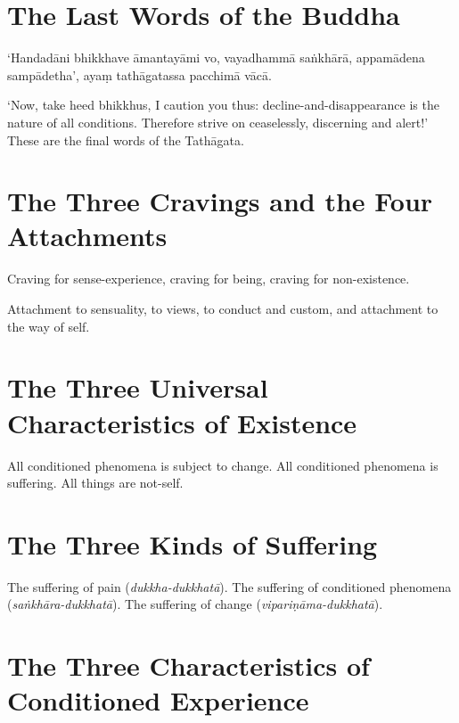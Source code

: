 \section*{The Last Words of the Buddha}

‘Handadāni bhikkhave āmantayāmi vo, vayadhammā saṅkhārā, appamādena sampādetha’,
ayaṃ tathāgatassa pacchimā vācā.

‘Now, take heed bhikkhus, I caution you thus: decline-and-disappearance is the
nature of all conditions. Therefore strive on ceaselessly, discerning and
alert!’ These are the final words of the Tathāgata.


\section*{The Three Cravings and the Four Attachments}

Craving for sense-experience, craving for being, craving for non-existence.

Attachment to sensuality, to views, to conduct and custom, and attachment to the
way of self.


\vspace*{-\baselineskip}

\section*{The Three Universal Characteristics of Existence}

All conditioned phenomena is subject to change.
All conditioned phenomena is suffering.
All things are not-self.


\vspace*{-\baselineskip}

\section*{The Three Kinds of Suffering}

The suffering of pain (\emph{dukkha-dukkhatā}).
The suffering of conditioned phenomena (\emph{saṅkhāra-dukkhatā}).
The suffering of change (\emph{vipariṇāma-dukkhatā}).\\
\mbox{}

\section*{The Three Characteristics of Conditioned Experience}

